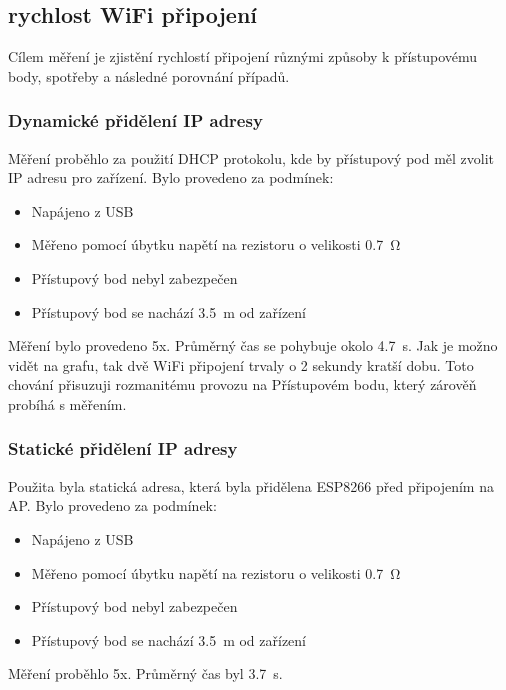 \documentclass[a4paper, 12pt]{report}
\begin{document}
			\subsection{rychlost WiFi připojení}
				Cílem měření je zjistění rychlostí připojení různými způsoby k přístupovému body, spotřeby a následné porovnání případů.
				\subsubsection{Dynamické přidělení IP adresy}
					Měření proběhlo za použití DHCP protokolu, kde by přístupový pod měl zvolit IP adresu pro zařízení. Bylo provedeno za podmínek:
					\begin{itemize}
						\item Napájeno z USB
						\item Měřeno pomocí úbytku napětí na rezistoru o velikosti \SI{0,7}{\ohm}
						\item Přístupový bod nebyl zabezpečen
						\item Přístupový bod se nachází \SI{3,5}{m} od zařízení
					\end{itemize}
					Měření bylo provedeno 5x. Průměrný čas se pohybuje okolo \SI{4,7}{s}. Jak je možno vidět na grafu, tak dvě WiFi připojení trvaly o 2 sekundy kratší dobu. Toto chování přisuzuji rozmanitému provozu na Přístupovém bodu, který zárověň probíhá s měřením.

				\subsubsection{Statické přidělení IP adresy}
					Použita byla statická adresa, která byla přidělena ESP8266 před připojením na AP. Bylo provedeno za podmínek:
					\begin{itemize}
						\item Napájeno z USB
						\item Měřeno pomocí úbytku napětí na rezistoru o velikosti \SI{0,7}{\ohm}
						\item Přístupový bod nebyl zabezpečen
						\item Přístupový bod se nachází \SI{3,5}{m} od zařízení
					\end{itemize}
					Měření proběhlo 5x. Průměrný čas byl \SI{3,7}{s}.\\
\end{document}
